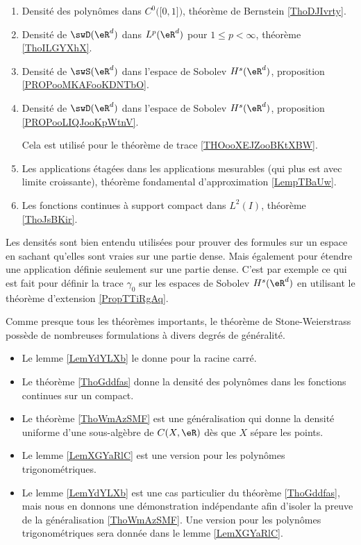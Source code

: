 
         \label{THEooPUIIooLDPUuq}
\begin{enumerate}
    \item 
        Densité des polynômes dans \( C^0\big( \mathopen[ 0 , 1 \mathclose] \big)\), théorème de Bernstein \ref{ThoDJIvrty}.
    \item
        Densité de \( \swD(\eR^d)\) dans \( L^p(\eR^d)\) pour \( 1\leq p<\infty\), théorème \ref{ThoILGYXhX}.
    \item
        Densité de \( \swS(\eR^d)\) dans l'espace de Sobolev \( H^s(\eR^d)\), proposition \ref{PROPooMKAFooKDNTbO}. 

    \item
        Densité de \( \swD(\eR^d)\) dans l'espace de Sobolev \( H^s(\eR^d)\), proposition \ref{PROPooLIQJooKpWtnV}. 

        Cela est utilisé pour le théorème de trace \ref{THOooXEJZooBKtXBW}.
    \item
        Les applications étagées dans les applications mesurables (qui plus est avec limite croissante), théorème fondamental d'approximation \ref{LempTBaUw}.
    \item
        Les fonctions continues à support compact dans \( L^2(I)\), théorème \ref{ThoJsBKir}.
\end{enumerate}
Les densités sont bien entendu utilisées pour prouver des formules sur un espace en sachant qu'elles sont vraies sur une partie dense. Mais également pour étendre une application définie seulement sur une partie dense. C'est par exemple ce qui est fait pour définir la trace \( \gamma_0\) sur les espaces de Sobolev \( H^s(\eR^d)\) en utilisant le théorème d'extension \ref{PropTTiRgAq}.

Comme presque tous les théorèmes importants, le théorème de Stone-Weierstrass possède de nombreuses formulations à divers degrés de généralité.
\begin{itemize}
    \item Le lemme \ref{LemYdYLXb} le donne pour la racine carré.
    \item Le théorème \ref{ThoGddfas} donne la densité des polynômes dans les fonctions continues sur un compact.
    \item Le théorème \ref{ThoWmAzSMF} est une généralisation qui donne la densité uniforme d'une sous-algèbre de \( C(X,\eR)\) dès que \( X\) sépare les points.
    \item Le lemme \ref{LemXGYaRlC} est une version pour les polynômes trigonométriques.
    \item
        Le lemme \ref{LemYdYLXb} est une cas particulier du
        théorème \ref{ThoGddfas}, mais nous en donnons une démonstration indépendante afin d'isoler la preuve
de la généralisation \ref{ThoWmAzSMF}. 
Une version pour les polynômes trigonométriques sera donnée dans le lemme \ref{LemXGYaRlC}.
\end{itemize}

